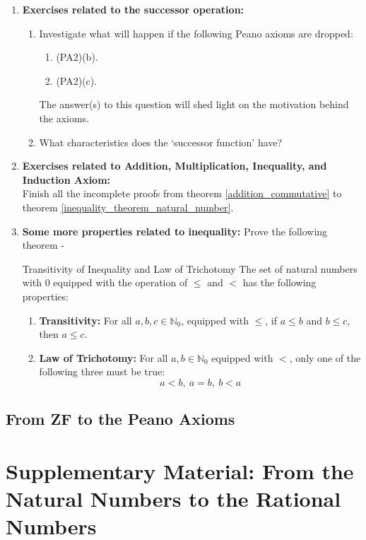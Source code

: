 \begin{enumerate}[label=\textbf{\arabic*.}]
	\item \textbf{Exercises related to the successor operation:}
	\begin{enumerate}
		\item Investigate what will happen if the following Peano axioms are dropped:
		\begin{enumerate}
			\item (PA2)(b).
			\item (PA2)(c).
		\end{enumerate}
		The answer(s) to this question will shed light on the motivation behind the axioms.
		\item What characteristics does the `successor function' have?
	\end{enumerate}
	\item \textbf{Exercises related to Addition, Multiplication, Inequality, and Induction Axiom:}\\
	Finish all the incomplete proofs from theorem \eqref{addition_commutative} to theorem \eqref{inequality_theorem_natural_number}.
	\item \textbf{Some more properties related to inequality:} Prove the following theorem -
	\begin{Theorem}{Transitivity of Inequality and Law of Trichotomy}\label{transitivity_of_inequality_and_law_of_trichotomy}
		The set of natural numbers with $0$ equipped with the operation of $\leq$ and $<$ has the following properties:
		\begin{enumerate}
			\item \textbf{Transitivity:} For all $a,b,c\in\mathbb{N}_0$, equipped with $\leq$, if $a\leq b$ and $b\leq c$, then $a\leq c$.
			\item \textbf{Law of Trichotomy:} For all $a,b\in\mathbb{N}_0$ equipped with $<$, only one of the following three must be true: $$a< b,\ a=b,\ b< a$$
		\end{enumerate}
	\end{Theorem}
\end{enumerate}
\subsection{From ZF to the Peano Axioms}
\section{Supplementary Material: From the Natural Numbers to the Rational Numbers}

